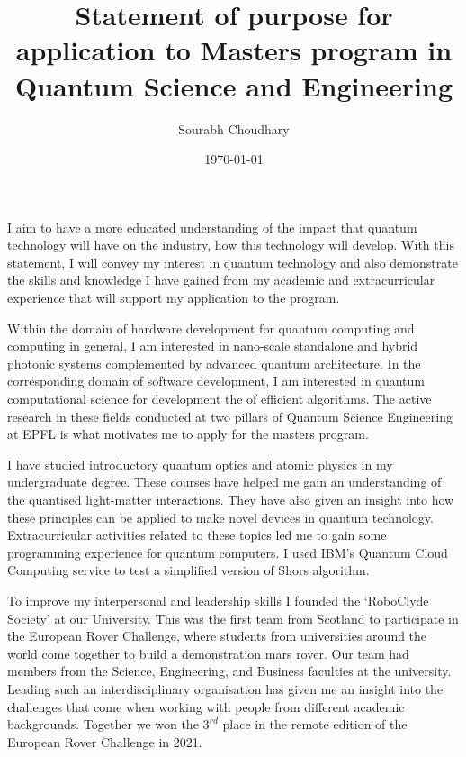 \documentclass[10pt]{article}
\title{Statement of purpose for application to Masters program in Quantum Science and Engineering} %
\author{Sourabh Choudhary} %
\date{\today} %
\begin{document}
\maketitle

I aim to have a more educated understanding of the impact that quantum technology will
have on the industry, how this technology will develop. 
With this statement, I will convey my interest in quantum technology and also 
demonstrate the skills and knowledge I have gained from my academic and extracurricular 
experience that will support my application to the program.

\vspace{5mm}

Within the domain of hardware development for quantum computing and computing in general, I am 
interested in nano-scale standalone and hybrid photonic systems complemented by advanced quantum 
architecture. In the corresponding domain of software development, I am interested in quantum 
computational science for development the of efficient algorithms. The active research in these 
fields conducted at two pillars of Quantum Science Engineering at EPFL is what motivates me to 
apply for the masters program.

\vspace{5mm}

I have studied introductory quantum optics and atomic physics in my undergraduate degree. These 
courses have helped me gain an understanding of the quantised light-matter interactions. They have
also given an insight into how these principles can be applied to make novel devices in quantum 
technology. Extracurricular activities related to these topics led me to gain some programming 
experience for quantum computers. I used IBM's Quantum Cloud Computing service to test a simplified 
version of Shors algorithm. 

\vspace{5mm}

To improve my interpersonal and leadership skills I founded the \enquote*{RoboClyde Society} at
our University. This was the first team from Scotland to participate in the 
European Rover Challenge, where students from universities around the world come together to build 
a demonstration mars rover. Our team had members from the Science, Engineering, and Business faculties
at the university. Leading such an interdisciplinary organisation has given me an insight into the 
challenges that come when working with people from different academic backgrounds. Together we 
won the $3^{rd}$ place in the remote edition of the European Rover Challenge in 2021.
\end{document}
